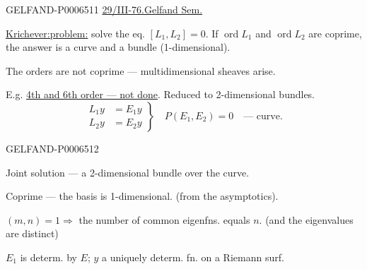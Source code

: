 \begin{GelfandAdjacentEvidence}{GELFAND-P000651}{1}
\underline{29/III-76.}\quad \underline{Gelfand Sem.}

\underline{Krichever:}\quad \underline{problem:} solve the eq. \([L_1,L_2]=0\).
If \(\operatorname{ord}L_1\) and \(\operatorname{ord}L_2\) are coprime, the answer is a curve and a bundle
(1-dimensional).

The orders are not coprime --- multidimensional sheaves arise.

E.g. \underline{4th and 6th order --- not done}. Reduced to 2-dimensional bundles.
\[
\left.\begin{aligned}
L_1y&=E_1y\\
L_2y&=E_2y
\end{aligned}\right\}
\quad P(E_1,E_2)=0\quad\text{--- curve.}
\]
\end{GelfandAdjacentEvidence}
\begin{GelfandAdjacentEvidence}{GELFAND-P000651}{2}

Joint solution --- a 2-dimensional bundle over the curve.

Coprime --- the basis is 1-dimensional. (from the asymptotics).

\((m,n)=1\Longrightarrow\) the number of common eigenfns. equals \(n\). (and the eigenvalues are distinct)

\(E_1\) is determ. by \(E\); \(y\) a uniquely determ. fn. on a Riemann surf.
\end{GelfandAdjacentEvidence}
